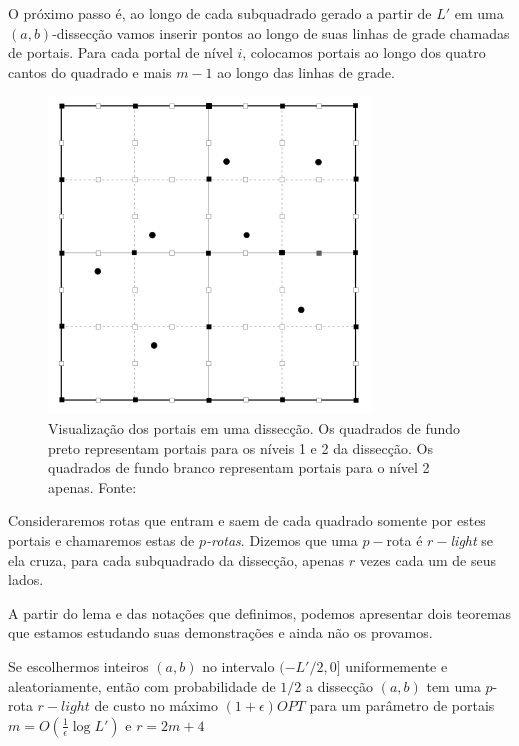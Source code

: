 O próximo passo é, ao longo de cada subquadrado gerado a partir de $L'$ em uma $(a,b)$-dissecção vamos inserir pontos ao longo de suas linhas de grade chamadas de portais. Para cada portal de nível $i$, colocamos portais ao longo dos quatro cantos do quadrado e mais $m-1$ ao longo das linhas de grade. 

\begin{figure}
\centering

\includegraphics{portals.png}

\centering

\caption{Visualização dos portais em uma dissecção. Os quadrados de fundo preto representam portais para os níveis 1 e 2 da dissecção. Os quadrados de fundo branco representam portais para o nível 2 apenas. Fonte: \cite{Williamson}}
\label{fig:etspportais}
\end{figure}

Consideraremos rotas que entram e saem de cada quadrado somente por estes portais e chamaremos estas de \textit{$p$-rotas}. Dizemos que uma $p-$rota é \textit{$r-$light} se ela cruza, para cada subquadrado da dissecção, apenas $r$ vezes cada um de seus lados. 

A partir do lema e das notações que definimos, podemos apresentar dois teoremas que estamos estudando suas demonstrações e ainda não os provamos.

\begin{teorema}
Se escolhermos inteiros $(a,b)$ no intervalo $( -L' / 2,0]$ uniformemente e aleatoriamente, então com probabilidade de $1/2$ a dissecção $(a,b)$ tem uma $p$-rota $r-light$ de custo no máximo $(1 + \epsilon) OPT$ para um parâmetro de portais $ m = O\left( \frac{1}{\epsilon} \log L' \right) $ e $r = 2m + 4$
\end{teorema}


